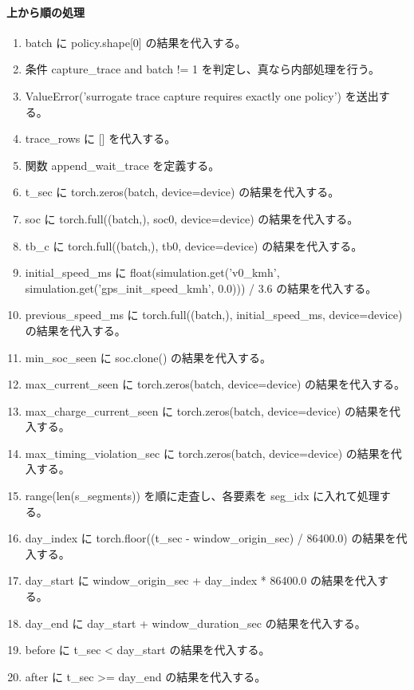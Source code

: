 \documentclass[a4paper,11pt]{article}
\begin{document}
            \paragraph{上から順の処理}
            \begin{enumerate}[leftmargin=1.8em]
            \item batch に policy.shape[0] の結果を代入する。
\item 条件 capture\_trace and batch != 1 を判定し、真なら内部処理を行う。
\item   ValueError('surrogate trace capture requires exactly one policy') を送出する。
\item trace\_rows に [] を代入する。
\item 関数 append\_wait\_trace を定義する。
\item t\_sec に torch.zeros(batch, device=device) の結果を代入する。
\item soc に torch.full((batch,), soc0, device=device) の結果を代入する。
\item tb\_c に torch.full((batch,), tb0, device=device) の結果を代入する。
\item initial\_speed\_ms に float(simulation.get('v0\_kmh', simulation.get('gps\_init\_speed\_kmh', 0.0))) / 3.6 の結果を代入する。
\item previous\_speed\_ms に torch.full((batch,), initial\_speed\_ms, device=device) の結果を代入する。
\item min\_soc\_seen に soc.clone() の結果を代入する。
\item max\_current\_seen に torch.zeros(batch, device=device) の結果を代入する。
\item max\_charge\_current\_seen に torch.zeros(batch, device=device) の結果を代入する。
\item max\_timing\_violation\_sec に torch.zeros(batch, device=device) の結果を代入する。
\item range(len(s\_segments)) を順に走査し、各要素を seg\_idx に入れて処理する。
\item   day\_index に torch.floor((t\_sec - window\_origin\_sec) / 86400.0) の結果を代入する。
\item   day\_start に window\_origin\_sec + day\_index * 86400.0 の結果を代入する。
\item   day\_end に day\_start + window\_duration\_sec の結果を代入する。
\item   before に t\_sec < day\_start の結果を代入する。
\item   after に t\_sec >= day\_end の結果を代入する。

\end{enumerate}
\end{document}
